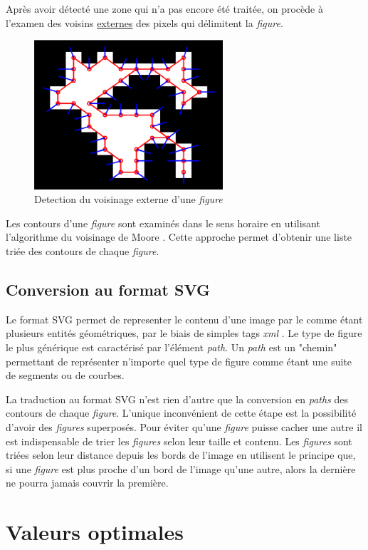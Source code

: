 \documentclass[twoside,openright,a4paper,11pt,french]{article}
\begin{document}
Après avoir détecté une zone qui n'a pas encore été traitée, on procède
à l'examen des voisins \underline{externes} des pixels qui délimitent
la {\it figure}.

\begin{figure}[h]
\centering
\includegraphics[width=7cm]{./pics/moore.eps}
\caption{Detection du voisinage externe d'une {\it figure}}
\label{fig:moore}
\end{figure}

Les contours d'une {\it figure} sont examinés dans le sens horaire en
utilisant l'algorithme du voisinage de Moore \cite{url-moore}. Cette
approche permet d'obtenir une liste triée des contours de chaque {\it
figure}.


\subsection{Conversion au format SVG}
Le format SVG permet de representer le contenu d'une image par le
comme étant plusieurs entités géométriques, par le biais de simples tags
{\it xml} \cite{url-svg}. Le type de figure le plus générique est
caractérisé par l'élément {\it path}. Un {\it path} est un "chemin"
permettant  de représenter n'importe quel type de figure comme étant
une suite de segments ou de courbes.

La traduction au format SVG n'est rien d'autre que la conversion en
{\it paths} des contours de chaque {\it figure}. L'unique inconvénient
de cette étape est la possibilité d'avoir des {\it
figures} superposés.  Pour éviter qu'une {\it figure} puisse cacher
une autre il est indispensable de trier les {\it figures} selon leur
taille et contenu. Les {\it figures} sont triées selon leur distance 
depuis les bords de l'image en utilisent le principe que, si une
{\it figure } est plus proche d'un bord de l'image qu'une autre,
alors la dernière ne pourra jamais couvrir la première.


\section{Valeurs optimales}



\newpage
{}


\end{document}
